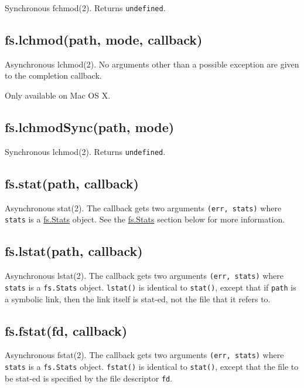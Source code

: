 Synchronous fchmod(2). Returns \texttt{undefined}.

\subsection{fs.lchmod(path, mode,
callback)}\label{fs.lchmodpath-mode-callback}

Asynchronous lchmod(2). No arguments other than a possible exception are
given to the completion callback.

Only available on Mac OS X.

\subsection{fs.lchmodSync(path, mode)}\label{fs.lchmodsyncpath-mode}

Synchronous lchmod(2). Returns \texttt{undefined}.

\subsection{fs.stat(path, callback)}\label{fs.statpath-callback}

Asynchronous stat(2). The callback gets two arguments
\texttt{(err,\ stats)} where \texttt{stats} is a
\hyperref[fsux5fclassux5ffsux5fstats]{fs.Stats} object. See the
\hyperref[fsux5fclassux5ffsux5fstats]{fs.Stats} section below for more
information.

\subsection{fs.lstat(path, callback)}\label{fs.lstatpath-callback}

Asynchronous lstat(2). The callback gets two arguments
\texttt{(err,\ stats)} where \texttt{stats} is a \texttt{fs.Stats}
object. \texttt{lstat()} is identical to \texttt{stat()}, except that if
\texttt{path} is a symbolic link, then the link itself is stat-ed, not
the file that it refers to.

\subsection{fs.fstat(fd, callback)}\label{fs.fstatfd-callback}

Asynchronous fstat(2). The callback gets two arguments
\texttt{(err,\ stats)} where \texttt{stats} is a \texttt{fs.Stats}
object. \texttt{fstat()} is identical to \texttt{stat()}, except that
the file to be stat-ed is specified by the file descriptor \texttt{fd}.

